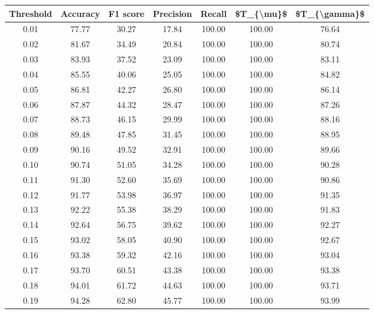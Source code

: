 \begin{tabular}{|c|c|c|c|c|c|c|}
\hline
 Threshold &  Accuracy &  F1 score &  Precision &  Recall &  \$T\_\{\textbackslash mu\}\$ &  \$T\_\{\textbackslash gamma\}\$ \\
\hline
      0.01 &     77.77 &     30.27 &      17.84 &  100.00 &     100.00 &         76.64 \\
      0.02 &     81.67 &     34.49 &      20.84 &  100.00 &     100.00 &         80.74 \\
      0.03 &     83.93 &     37.52 &      23.09 &  100.00 &     100.00 &         83.11 \\
      0.04 &     85.55 &     40.06 &      25.05 &  100.00 &     100.00 &         84.82 \\
      0.05 &     86.81 &     42.27 &      26.80 &  100.00 &     100.00 &         86.14 \\
      0.06 &     87.87 &     44.32 &      28.47 &  100.00 &     100.00 &         87.26 \\
      0.07 &     88.73 &     46.15 &      29.99 &  100.00 &     100.00 &         88.16 \\
      0.08 &     89.48 &     47.85 &      31.45 &  100.00 &     100.00 &         88.95 \\
      0.09 &     90.16 &     49.52 &      32.91 &  100.00 &     100.00 &         89.66 \\
      0.10 &     90.74 &     51.05 &      34.28 &  100.00 &     100.00 &         90.28 \\
      0.11 &     91.30 &     52.60 &      35.69 &  100.00 &     100.00 &         90.86 \\
      0.12 &     91.77 &     53.98 &      36.97 &  100.00 &     100.00 &         91.35 \\
      0.13 &     92.22 &     55.38 &      38.29 &  100.00 &     100.00 &         91.83 \\
      0.14 &     92.64 &     56.75 &      39.62 &  100.00 &     100.00 &         92.27 \\
      0.15 &     93.02 &     58.05 &      40.90 &  100.00 &     100.00 &         92.67 \\
      0.16 &     93.38 &     59.32 &      42.16 &  100.00 &     100.00 &         93.04 \\
      0.17 &     93.70 &     60.51 &      43.38 &  100.00 &     100.00 &         93.38 \\
      0.18 &     94.01 &     61.72 &      44.63 &  100.00 &     100.00 &         93.71 \\
      0.19 &     94.28 &     62.80 &      45.77 &  100.00 &     100.00 &         93.99 \\

\end{tabular}
